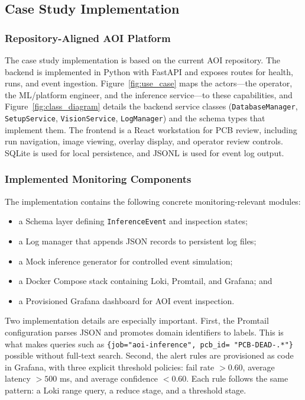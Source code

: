 \documentclass[12pt,a4paper]{article}
\begin{document}
\subsection{Case Study Implementation}

\subsubsection{Repository-Aligned AOI Platform}
The case study implementation is based on the current AOI repository. The
backend is implemented in Python with FastAPI and exposes routes for health,
runs, and event ingestion. Figure~\ref{fig:use_case} maps the actors---the operator,
the ML/platform engineer, and the inference service---to these capabilities, and
Figure~\ref{fig:class_diagram} details the backend service classes
(\texttt{DatabaseManager}, \texttt{SetupService}, \texttt{VisionService},
\texttt{LogManager}) and the schema types that implement them. The frontend is a
React workstation for PCB review,
including run navigation, image viewing, overlay display, and operator review
controls. SQLite is used for local persistence, and JSONL is used for event log
output.

\subsubsection{Implemented Monitoring Components}
The implementation contains the following concrete monitoring-relevant modules:
\begin{itemize}
    \item a Schema layer defining \texttt{InferenceEvent} and inspection states;
    \item a Log manager that appends JSON records to persistent log files;
    \item a Mock inference generator for controlled event simulation;
    \item a Docker Compose stack containing Loki, Promtail, and Grafana; and
    \item a Provisioned Grafana dashboard for AOI event inspection.
\end{itemize}

Two implementation details are especially important. First, the Promtail
configuration parses JSON and promotes domain identifiers to labels. This is
what makes queries such as \texttt{\{job="aoi-inference",
pcb\_id=~"PCB-DEAD-.*"\}} possible without full-text search. Second, the alert
rules are provisioned as code in Grafana, with three explicit threshold
policies: fail rate \(> 0.60\), average latency \(> 500\) ms, and average
confidence \(< 0.60\). Each rule follows the same pattern: a Loki range query,
a reduce stage, and a threshold stage.
\end{document}
